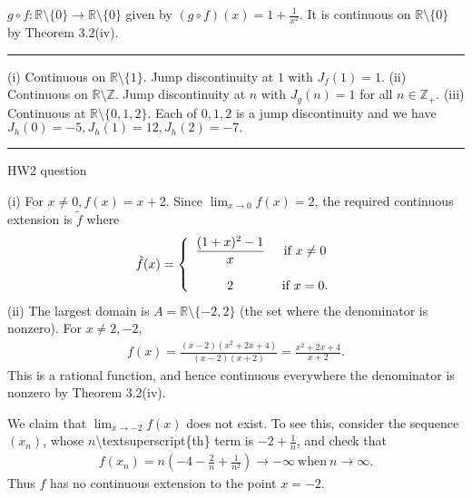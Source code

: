 \documentclass[letterpaper,10pt,english]{jupyterBook}
\begin{document}
\(g \circ f:\mathbb{R} \setminus \{0\} \to \mathbb{R} \setminus \{0\}\) given by \((g \circ f)(x) = {1  + \frac{1}{x^2}}\). It is continuous on \(\mathbb{R} \setminus \{0\}\) by Theorem 3.2(iv).


\bigskip\hrule\bigskip


\sphinxAtStartPar
{\hyperref[\detokenize{Problems:id17}]{}}
(i) Continuous on \(\mathbb{R} \setminus \{1\}\). Jump discontinuity at \(1\) with \(J_{f}(1) = 1\).
(ii) Continuous on \(\mathbb{R} \setminus \mathbb{Z}\). Jump discontinuity at \(n\) with \(J_{g}(n) = 1\) for all \(n\in\mathbb{Z}_+\).
(iii) Continuous at \(\mathbb{R} \setminus \{0,1,2\}\). Each of \(0, 1, 2\) is a jump discontinuity and we have \(J_{h}(0) =-5, J_{h}(1) = 12, J_{h}(2) = -7.\)


\bigskip\hrule\bigskip


\sphinxAtStartPar
{\hyperref[\detokenize{Problems:id18}]{}} HW2 question

\sphinxAtStartPar
(i) For \(x \neq 0, f(x) = x+2\). Since \(\lim_{x \rightarrow 0}f(x) = 2\), the required continuous extension is \(\tilde{f}\) where
\begin{equation*}
\begin{split}
\tilde{f}(x) = \left\{\begin{array}{c c} \displaystyle\frac{(1 + x)^{2} - 1}{x} & ~\mbox{if}~x \neq 0\\ 
& \\
2 & ~\mbox{if}~x = 0. \end{array} \right.
\end{split}
\end{equation*}
\sphinxAtStartPar
(ii) The largest domain is \(A=\mathbb{R} \setminus \{-2, 2\}\) (the set where the denominator is non\sphinxhyphen{}zero). For \(x \neq 2, -2\),
\begin{equation*}
\begin{split}
f(x) = \frac{(x-2)(x^{2} + 2x + 4)}{(x-2)(x+2)}=\frac{x^{2} + 2x + 4}{x + 2}.
\end{split}
\end{equation*}
\sphinxAtStartPar
This is a rational function, and hence continuous everywhere the denominator is non\sphinxhyphen{}zero by Theorem 3.2(iv).

We claim that \(\lim_{x \rightarrow -2}f(x)\) does not exist. To see this, consider the sequence \((x_{n})\), whose \(n\)\textbackslash{}textsuperscript\{th\} term is \(-2 + \frac{1}{n}\), and check that
\begin{equation*}
\begin{split}
f(x_{n}) = n\left(-4 -\frac{2}{n} + \frac{1}{n^2}\right) \rightarrow -\infty~\mbox{when}~n \rightarrow \infty.
\end{split}
\end{equation*}
\sphinxAtStartPar
Thus \(f\) has no continuous extension to the point \(x =-2\).
\end{document}
